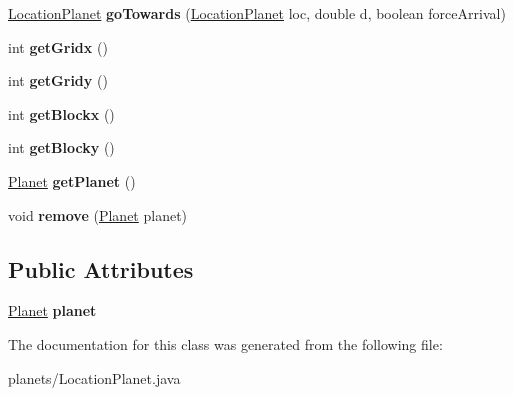 \begin{DoxyCompactItemize}
\item 
\hyperlink{classplanets_1_1_location_planet}{Location\+Planet} {\bfseries go\+Towards} (\hyperlink{classplanets_1_1_location_planet}{Location\+Planet} loc, double d, boolean force\+Arrival)\hypertarget{classplanets_1_1_location_planet_ad36c7f854b6602f5724da8b78fad5bc2}{}\label{classplanets_1_1_location_planet_ad36c7f854b6602f5724da8b78fad5bc2}

\item 
int {\bfseries get\+Gridx} ()\hypertarget{classplanets_1_1_location_planet_add7591fe2fe5e05ed257fd4601db4a88}{}\label{classplanets_1_1_location_planet_add7591fe2fe5e05ed257fd4601db4a88}

\item 
int {\bfseries get\+Gridy} ()\hypertarget{classplanets_1_1_location_planet_a977a834f6159b2246ef424abadc2d0a6}{}\label{classplanets_1_1_location_planet_a977a834f6159b2246ef424abadc2d0a6}

\item 
int {\bfseries get\+Blockx} ()\hypertarget{classplanets_1_1_location_planet_a49e46f037a769ce6b9c50511f915d573}{}\label{classplanets_1_1_location_planet_a49e46f037a769ce6b9c50511f915d573}

\item 
int {\bfseries get\+Blocky} ()\hypertarget{classplanets_1_1_location_planet_a1ba55bc726b42400fb9dec100ab03657}{}\label{classplanets_1_1_location_planet_a1ba55bc726b42400fb9dec100ab03657}

\item 
\hyperlink{classplanets_1_1_planet}{Planet} {\bfseries get\+Planet} ()\hypertarget{classplanets_1_1_location_planet_a34b17583d28ad46bdea0395da9ce8456}{}\label{classplanets_1_1_location_planet_a34b17583d28ad46bdea0395da9ce8456}

\item 
void {\bfseries remove} (\hyperlink{classplanets_1_1_planet}{Planet} planet)\hypertarget{classplanets_1_1_location_planet_adf63840175c136b6685887f7296e3840}{}\label{classplanets_1_1_location_planet_adf63840175c136b6685887f7296e3840}

\end{DoxyCompactItemize}
\subsection*{Public Attributes}
\begin{DoxyCompactItemize}
\item 
\hyperlink{classplanets_1_1_planet}{Planet} {\bfseries planet}\hypertarget{classplanets_1_1_location_planet_a417ffee5838f02fac79e3073b715f4c1}{}\label{classplanets_1_1_location_planet_a417ffee5838f02fac79e3073b715f4c1}

\end{DoxyCompactItemize}


The documentation for this class was generated from the following file\+:\begin{DoxyCompactItemize}
\item 
planets/Location\+Planet.\+java\end{DoxyCompactItemize}
